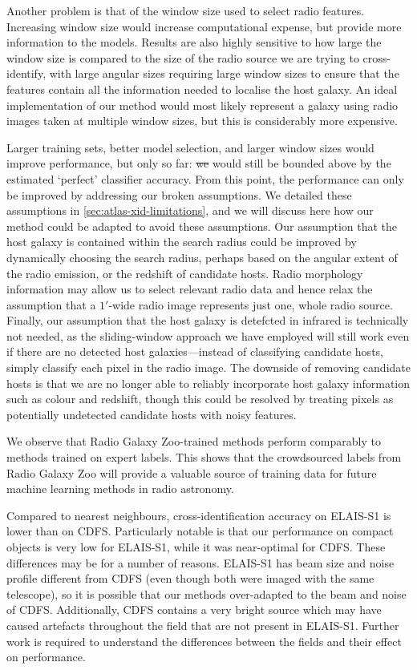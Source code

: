 \documentclass[11pt, a4paper]{book}
\providecommand{\DIFaddtex}[1]{{\protect\color{blue}\uwave{#1}}} %
\providecommand{\DIFdeltex}[1]{{\protect\color{red}\sout{#1}}}                      %
\providecommand{\DIFaddbegin}{} %
\providecommand{\DIFaddend}{} %
\providecommand{\DIFdelbegin}{} %
\providecommand{\DIFdelend}{} %
\providecommand{\DIFadd}[1]{\texorpdfstring{\DIFaddtex{#1}}{#1}} %
\providecommand{\DIFdel}[1]{\texorpdfstring{\DIFdeltex{#1}}{}} %
\newcommand{\DIFscaledelfig}{0.5}
\newlength{\DIFdelgraphicswidth} %
\newlength{\DIFdelgraphicsheight} %
\newcommand{\DIFaddincludegraphics}[2][]{{\color{blue}\fbox{\DIFOincludegraphics[#1]{#2}}}} %
\newcommand{\DIFdelincludegraphics}[2][]{%
\sbox{\DIFdelgraphicsbox}{\DIFOincludegraphics[#1]{#2}}%
\settoboxwidth{\DIFdelgraphicswidth}{\DIFdelgraphicsbox} %
\settoboxtotalheight{\DIFdelgraphicsheight}{\DIFdelgraphicsbox} %
\scalebox{\DIFscaledelfig}{%
\parbox[b]{\DIFdelgraphicswidth}{\usebox{\DIFdelgraphicsbox}\\[-\baselineskip] \rule{\DIFdelgraphicswidth}{0em}}\llap{\resizebox{\DIFdelgraphicswidth}{\DIFdelgraphicsheight}{%
\setlength{\unitlength}{\DIFdelgraphicswidth}%
\begin{picture}(1,1)%
\thicklines\linethickness{2pt} %
{\color[rgb]{1,0,0}\put(0,0){\framebox(1,1){}}}%
{\color[rgb]{1,0,0}\put(0,0){\line( 1,1){1}}}%
{\color[rgb]{1,0,0}\put(0,1){\line(1,-1){1}}}%
\end{picture}%
}\hspace*{3pt}}} %
} %
\DeclareRobustCommand{\DIFaddbegin}{\DIFOaddbegin \let\includegraphics\DIFaddincludegraphics} %
\DeclareRobustCommand{\DIFaddend}{\DIFOaddend \let\includegraphics\DIFOincludegraphics} %
\DeclareRobustCommand{\DIFdelbegin}{\DIFOdelbegin \let\includegraphics\DIFdelincludegraphics} %
\DeclareRobustCommand{\DIFdelend}{\DIFOaddend \let\includegraphics\DIFOincludegraphics} %
\begin{document}
  Another problem is that of the window size used to select radio features.
  Increasing window size would increase computational expense, but provide
  more information to the models. Results are also highly sensitive to how
  large the window size is compared to the size of the radio source we are
  trying to cross-identify, with large angular sizes requiring large window
  sizes to ensure that the features contain all the information needed to
  localise the host galaxy. An ideal implementation of our method would most
  likely represent a galaxy using radio images taken at multiple window
  sizes, but this is considerably more expensive.

  Larger training sets, better model selection, and larger window sizes would
  improve performance, but only so far: \DIFdelbegin \DIFdel{we }\DIFdelend \DIFaddbegin \DIFadd{We }\DIFaddend would still be bounded above by the
  estimated `perfect' classifier accuracy. From this point, the performance
  can only be improved by addressing our broken assumptions. We detailed
  these assumptions in \autoref{sec:atlas-xid-limitations}, and we will discuss here how
  {our method could be adapted to avoid these assumptions}. Our assumption that the host galaxy is contained
  within the search radius could be improved by dynamically choosing the
  search radius, perhaps based on the angular extent of the radio emission, or the
  redshift of candidate hosts. Radio morphology information may allow us to
  select relevant radio data and hence relax the assumption that a $1'$-wide
  radio image represents just one, whole radio source. Finally, our assumption
  that the host galaxy is detefcted in infrared is technically not needed, as
  the sliding-window approach we have employed will still work even if there
  are no detected host galaxies---instead of classifying candidate hosts,
  simply classify each pixel in the radio image. The downside of removing
  candidate hosts is that we are no longer able to reliably incorporate host
  galaxy information such as colour and redshift, though this could be
  resolved by treating pixels as potentially undetected candidate hosts with
  noisy features.

  We observe that Radio Galaxy Zoo-trained methods perform comparably to
  methods trained on expert labels. This shows that the crowdsourced labels
  from Radio Galaxy Zoo will provide a valuable source of training
  data for future machine learning methods in radio astronomy.

  Compared to nearest neighbours, cross-identification accuracy on ELAIS-S1 is
  lower than on CDFS. Particularly notable is that our performance on compact
  objects is very low for ELAIS-S1, while it was near-optimal for CDFS. These
  differences may be for a number of reasons. ELAIS-S1 has beam size and noise
  profile different from CDFS (even though both were imaged with the same
  telescope), so it is possible that our methods over-adapted to the beam and
  noise of CDFS. Additionally, CDFS contains a very bright source which may
  have caused artefacts throughout the field that are not present in ELAIS-S1.
  Further work is required to understand the differences between the fields
  and their effect on performance.
\end{document}

